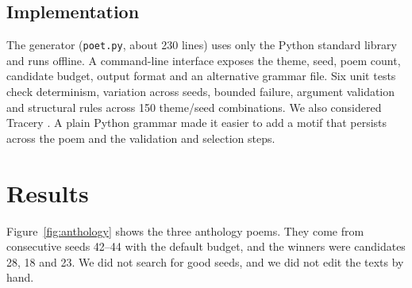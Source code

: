 \documentclass[letterpaper]{article}
\newcommand{\code}[1]{\texttt{\small #1}}
\begin{document}
\subsection{Implementation}
The generator (\code{poet.py}, about 230 lines) uses only the Python
standard library and runs offline. A command-line interface exposes
the theme, seed, poem count, candidate budget, output format and an
alternative grammar file. Six unit tests check determinism, variation
across seeds, bounded failure, argument validation and structural rules
across 150 theme/seed combinations. We also considered Tracery
\citep{compton2015tracery}. A plain Python grammar made it easier to
add a motif that persists across the poem and the validation and
selection steps.

\section{Results}
Figure~\ref{fig:anthology} shows the three anthology poems. They come
from consecutive seeds 42--44 with the default budget, and the winners
were candidates 28, 18 and 23. We did not search for good seeds, and
we did not edit the texts by hand.
\end{document}
